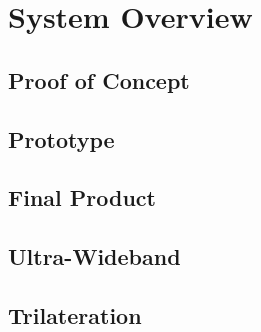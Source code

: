 

\setcounter{section}{1}
\section{System Overview}
\bigskip

\subsection{Proof of Concept}

\subsection{Prototype}

\subsection{Final Product}

\subsection{Ultra-Wideband}

\subsection{Trilateration}




